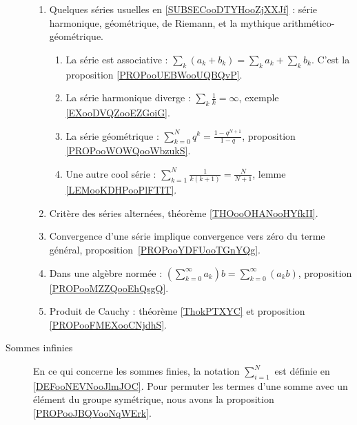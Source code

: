 \begin{description}
	      \begin{enumerate}
		      \item
		            Quelques séries usuelles en \ref{SUBSECooDTYHooZjXXJf} : série harmonique, géométrique, de Riemann, et la mythique arithmético-géométrique.
		            \begin{enumerate}
			            \item
			                  La série est associative : \( \sum_k(a_k+b_k)=\sum_ka_k+\sum_kb_k\). C'est la proposition \ref{PROPooUEBWooUQBQvP}.
			            \item
			                  La série harmonique diverge : \( \sum_k\frac{1}{ k }=\infty\), exemple \ref{EXooDVQZooEZGoiG}.
			            \item
			                  La série géométrique : \( \sum_{k=0}^Nq^k=\frac{ 1-q^{N+1} }{ 1-q }\), proposition \ref{PROPooWOWQooWbzukS}.
			            \item
			                  Une autre cool série : \( \sum_{k=1}^N\frac{ 1 }{ k(k+1) }=\frac{ N }{ N+1 }\), lemme \ref{LEMooKDHPooPlFTIT}.
		            \end{enumerate}
		      \item
		            Critère des séries alternées, théorème \ref{THOooOHANooHYfkII}.
		      \item
		            Convergence d'une série implique convergence vers zéro du terme général, proposition~\ref{PROPooYDFUooTGnYQg}.
		      \item
		            Dans une algèbre normée : \( (\sum_{k=0}^{\infty}a_k)b=\sum_{k=0}^{\infty}(a_kb)\), proposition \ref{PROPooMZZQooEhQsgQ}.
		      \item
		            Produit de Cauchy : théorème \ref{ThokPTXYC} et proposition \ref{PROPooFMEXooCNjdhS}.
	      \end{enumerate}

	\item[Sommes infinies]
	      En ce qui concerne les sommes finies, la notation \( \sum_{i=1}^N\) est définie en \ref{DEFooNEVNooJlmJOC}. Pour permuter les termes d'une somme avec un élément du groupe symétrique, nous avons la proposition \ref{PROPooJBQVooNqWErk}.


\end{description}
